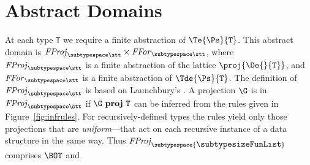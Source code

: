 \documentclass[11pt]{article}
\begin{document}
\section{Abstract Domains}

At each type \mbox{\tt T} we require a finite abstraction of $\Te{\Ps}{\mbox{\tt T}}$.
This abstract domain is ${\it{}FProj}_{\subtypespace\stt}\times{\it{}FFor}_{\subtypespace\stt}$,
where ${\it{}FProj}_{\subtypespace\stt}$ is a finite abstraction of the lattice
$\proj{\De{}{\mbox{\tt T}}}$, and ${\it{}FFor}_{\subtypespace\stt}$ is a finite abstraction
of $\Tde{\Ps}{\mbox{\tt T}}$.  The definition of ${\it{}FProj}_{\subtypespace\stt}$ is based
on Launchbury's \cite{Lau91a}.  A projection $\G$ is in
${\it{}FProj}_{\subtypespace\stt}$ if $\G~\mbox{\bf proj}~\mbox{\tt T}$ can be inferred from
the rules given in Figure~\ref{fig:infrules}.
%
For recursively-defined types the rules yield only those projections
that are {\it uniform}---that act on each recursive instance of a 
data structure in the same
way.  Thus ${\it{}FProj}_{\subtypespace{\makebox{\subtypesize\tt FunList}} }$ comprises $\BOT$ and
\end{document}
